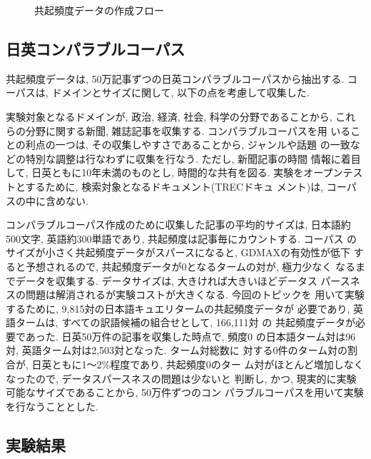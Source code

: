 \begin{figure*}[tb]
\vspace*{-6mm} 
     \begin{center}
      \end{center}
  \caption{共起頻度データの作成フロー}
  \label{datamake}
\end{figure*}

\subsection{日英コンパラブルコーパス}

共起頻度データは, 50万記事ずつの日英コンパラブルコーパスから抽出する. 
コーパスは, ドメインとサイズに関して, 以下の点を考慮して収集した. 


実験対象となるドメインが, 政治, 経済, 社会, 科学の分野であることから, 
これらの分野に関する新聞, 雑誌記事を収集する. コンパラブルコーパスを用
いることの利点の一つは, その収集しやすさであることから, ジャンルや話題
の一致などの特別な調整は行なわずに収集を行なう. ただし, 新聞記事の時間
情報に着目して, 日英ともに10年未満のものとし, 時間的な共有を図る. 
実験をオープンテストとするために, 検索対象となるドキュメント(TRECドキュ
メント)は, コーパスの中に含めない. 

\newpage


コンパラブルコーパス作成のために収集した記事の平均的サイズは, 日本語約
500文字, 英語約300単語であり, 共起頻度は記事毎にカウントする. コーパス
のサイズが小さく共起頻度データがスパースになると, GDMAXの有効性が低下
すると予想されるので, 共起頻度データが0となるタームの対が, 極力少なく
なるまでデータを収集する. データサイズは, 大きければ大きいほどデータス
パースネスの問題は解消されるが実験コストが大きくなる. 今回のトピックを
用いて実験するために, 9,815対の日本語キュエリタームの共起頻度データが
必要であり, 英語タームは, すべての訳語候補の組合せとして, 166,111対 の
共起頻度データが必要であった. 日英50万件の記事を収集した時点で, 頻度0
の日本語ターム対は96対, 英語ターム対は2,503対となった. ターム対総数に
対する0件のターム対の割合が, 日英ともに1〜2\%程度であり, 共起頻度0のター
ム対がほとんど増加しなくなったので, データスパースネスの問題は少ないと
判断し, かつ, 現実的に実験可能なサイズであることから, 50万件ずつのコン
パラブルコーパスを用いて実験を行なうこととした. 

\subsection{実験結果}


